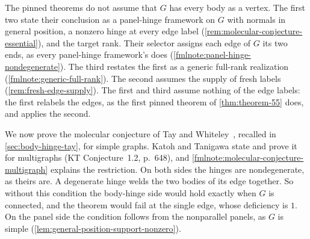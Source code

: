 \begin{fmlnote}
  The pinned theorems do not assume that $G$ has every body as a vertex.
  The first two state their conclusion as a panel-hinge framework on $G$
  with normals in general position, a nonzero hinge at every edge label
  (\cref{rem:molecular-conjecture-essential}), and the target rank. Their
  selector assigns each edge of $G$ its two ends, as every panel-hinge
  framework's does (\cref{fmlnote:panel-hinge-nondegenerate}). The
  third restates the first as a generic full-rank realization
  (\cref{fmlnote:generic-full-rank}). The second assumes the supply of
  fresh labels (\cref{rem:fresh-edge-supply}). The first and third
  assume nothing of the edge labels: the first relabels the edges, as
  the first pinned theorem of \cref{thm:theorem-55} does, and applies
  the second.
\end{fmlnote}

We now prove the molecular conjecture of Tay and
Whiteley~\cite{tayWhiteley1984}, recalled in \cref{sec:body-hinge-tay},
for simple graphs. Katoh and Tanigawa state and prove it for multigraphs
(KT Conjecture~1.2, p.~648), and
\cref{fmlnote:molecular-conjecture-multigraph} explains the restriction.
On both sides the hinges are nondegenerate, as theirs are. A degenerate
hinge welds the two bodies of its edge together. So without this
condition the body-hinge side would hold exactly when $G$ is connected,
and the theorem would fail at the single edge, whose deficiency is $1$.
On the panel side the condition follows from the nonparallel panels, as
$G$ is simple (\cref{lem:general-position-support-nonzero}).

